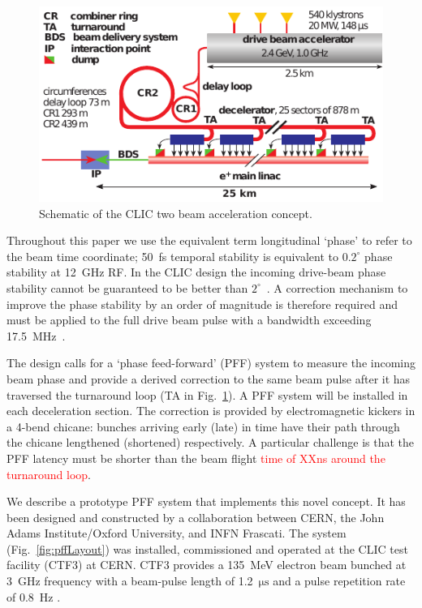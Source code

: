 \documentclass[%
 reprint,
 superscriptaddress,
 amsmath,
 amssymb,
 prl,
]{revtex4-1}
\begin{document}
\begin{figure}
	\includegraphics[width=\columnwidth]{figs/alt/clicLayout_cut_new}
	\caption{\label{fig:CLICLayout} Schematic of the CLIC two beam acceleration 
	concept.
	}
\end{figure}


Throughout this paper we use the equivalent 
term longitudinal ‘phase’ to refer to the beam time coordinate; 50~fs temporal 
stability is equivalent to \(0.2^\circ\) phase stability at 12~GHz RF. In the 
CLIC design the incoming drive-beam phase stability cannot be guaranteed to be 
better than \(2^\circ\)~\cite{CLICCDR}. A correction mechanism to improve the 
phase stability by an order of magnitude is 
therefore required and must be applied to the full drive beam pulse with a 
bandwidth exceeding 17.5~MHz~\cite{Gerber2015}. 

The design calls for a `phase feed-forward' (PFF) system to measure the 
incoming beam phase and provide a derived correction to the same beam pulse 
after it has traversed the turnaround loop (TA in Fig.~\ref{fig:CLICLayout}). A 
PFF system will be installed in each deceleration section. The correction is 
provided by electromagnetic kickers in a 4-bend chicane: bunches arriving 
early (late) in time have their path through the chicane lengthened (shortened) 
respectively. A particular challenge is that the PFF latency must be shorter 
than the beam flight \textcolor{red}{time of XXns around the turnaround loop}.

We describe a prototype PFF system that implements this novel concept. 
It has been designed and constructed by a collaboration 
between CERN, the John Adams Institute/Oxford University, and INFN Frascati. 
The system (Fig.~\ref{fig:pffLayout}) was installed, commissioned and operated 
at the CLIC test facility (CTF3) at CERN. CTF3 provides a 
135~MeV electron beam bunched at 3~GHz frequency with a beam-pulse length of 
1.2~\(\mathrm{\mu s}\) and a pulse repetition rate of 0.8~Hz \cite{CLICCDR}. 
\end{document}
